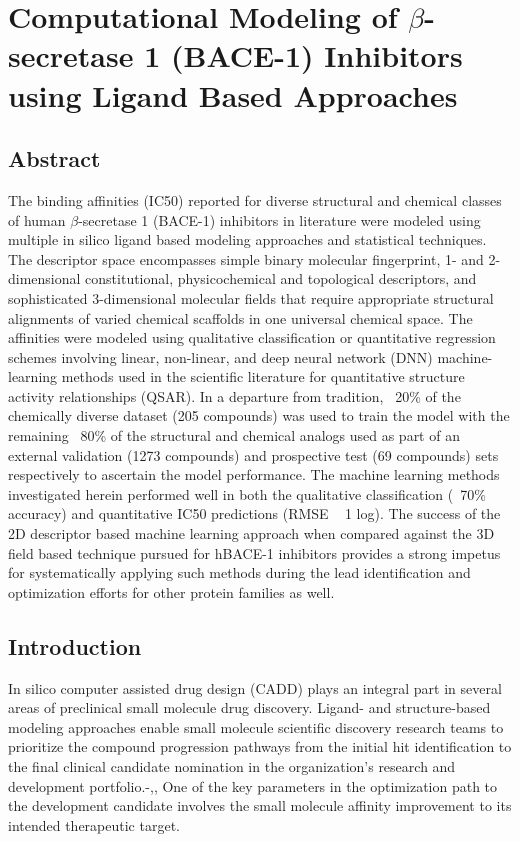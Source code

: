 \section{Computational Modeling of $\beta$-secretase 1 (BACE-1) Inhibitors using Ligand Based Approaches}

\subsection{Abstract}
The binding affinities (IC50) reported for diverse structural and chemical classes of human $\beta$-secretase 1 (BACE-1) inhibitors in literature were modeled using multiple in silico ligand based modeling approaches and statistical techniques.  The descriptor space encompasses simple binary molecular fingerprint, 1- and 2-dimensional constitutional, physicochemical and topological descriptors, and sophisticated 3-dimensional molecular fields that require appropriate structural alignments of varied chemical scaffolds in one universal chemical space.  The affinities were modeled using qualitative classification or quantitative regression schemes involving linear, non-linear, and deep neural network (DNN) machine-learning methods used in the scientific literature for quantitative structure activity relationships (QSAR).  In a departure from tradition, ~20\% of the chemically diverse dataset (205 compounds) was used to train the model with the remaining ~80\% of the structural and chemical analogs used as part of an external validation (1273 compounds) and prospective test (69 compounds) sets respectively to ascertain the model performance.  The machine learning methods investigated herein performed well in both the qualitative classification (~70\% accuracy) and quantitative IC50 predictions (RMSE ~ 1 log).  The success of the 2D descriptor based machine learning approach when compared against the 3D field based technique pursued for hBACE-1 inhibitors provides a strong impetus for systematically applying such methods during the lead identification and optimization efforts for other protein families as well.


\subsection{Introduction}

In silico computer assisted drug design (CADD) plays an integral part in several areas of preclinical small molecule drug discovery.  Ligand- and structure-based modeling approaches enable small molecule scientific discovery research teams to prioritize the compound progression pathways from the initial hit identification to the final clinical candidate nomination in the organization’s research and development portfolio.-,,  One of the key parameters in the optimization path to the development candidate involves the small molecule affinity improvement to its intended therapeutic target.  


